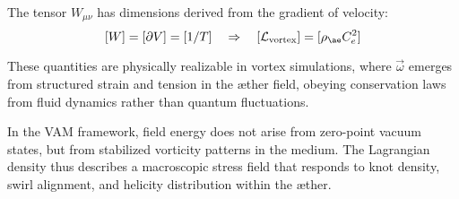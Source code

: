 The tensor $W_{\mu\nu}$ has dimensions derived from the gradient of velocity:
\[
    [W] = [\partial V] = [1/T] \quad \Rightarrow \quad [\mathcal{L}_\text{vortex}] = [\rho_{\ae} C_e^2]
\]

These quantities are physically realizable in vortex simulations, where $\vec{\omega}$ emerges from structured strain and tension in the æther field, obeying conservation laws from fluid dynamics rather than quantum fluctuations.

In the VAM framework, field energy does not arise from zero-point vacuum states, but from stabilized vorticity patterns in the medium. The Lagrangian density thus describes a macroscopic stress field that responds to knot density, swirl alignment, and helicity distribution within the æther.
